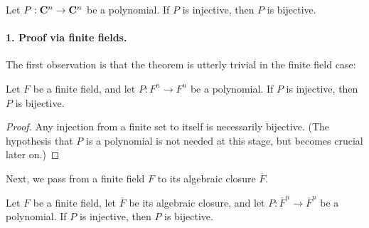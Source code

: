 
\begin{theorem}
Let $P:{\bf C}^n\to{\bf C}^n$ be a polynomial. If $P$ is injective, then $P$ is bijective.
\end{theorem}
\paragraph{1. Proof via finite fields.}
The first observation is that the theorem is utterly trivial in the finite field case:
\begin{theorem}
Let $F$ be a finite field, and let $P:F^n\to F^n$ be a polynomial. If $P$ is injective, then $P$ is bijective.
\end{theorem}
\begin{proof}
Any injection from a finite set to itself is necessarily bijective. (The hypothesis that $P$ is a polynomial is not needed at this stage, but becomes crucial later on.)
\end{proof}
Next, we pass from a finite field $F$ to its algebraic closure $\overline F$.
\begin{theorem}
Let $F$ be a finite field, let $\overline F$ be its algebraic closure, and let $P:\overline F^n\to\overline F^n$ be a polynomial. If $P$ is injective, then $P$ is bijective.
\end{theorem}
